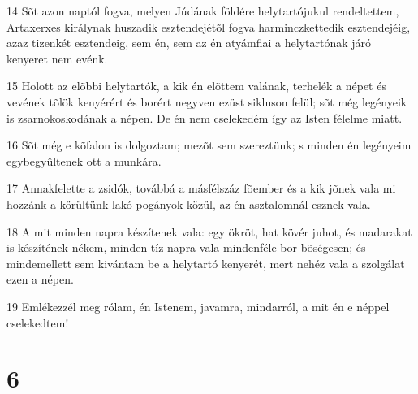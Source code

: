 \par 14 Sõt azon naptól fogva, melyen Júdának földére helytartójukul rendeltettem, Artaxerxes királynak huszadik esztendejétõl fogva harminczkettedik esztendejéig, azaz tizenkét esztendeig, sem én, sem az én atyámfiai a helytartónak járó kenyeret nem evénk.
\par 15 Holott az elõbbi helytartók, a kik én elõttem valának, terhelék a népet és vevének tõlök kenyérért és borért negyven ezüst sikluson felül; sõt még legényeik is zsarnokoskodának a népen. De én nem cselekedém így az Isten félelme miatt.
\par 16 Sõt még e kõfalon is dolgoztam; mezõt sem szereztünk; s minden én legényeim egybegyûltenek ott a munkára.
\par 17 Annakfelette a zsidók, továbbá a másfélszáz fõember és a kik jõnek vala mi hozzánk a körültünk lakó pogányok közül, az én asztalomnál esznek vala.
\par 18 A mit minden napra készítenek vala: egy ökröt, hat kövér juhot, és madarakat is készítének nékem, minden tíz napra vala mindenféle bor bõségesen; és mindemellett sem kivántam be a helytartó kenyerét, mert nehéz vala a szolgálat ezen a népen.
\par 19 Emlékezzél meg rólam, én Istenem, javamra, mindarról, a mit én e néppel cselekedtem!

\chapter{6}


